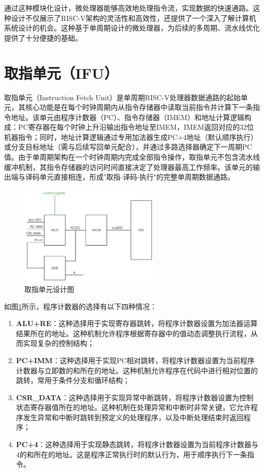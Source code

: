 通过这种模块化设计，微处理器能够高效地处理指令流，实现数据的快速通路。这种设计不仅展示了RISC-V架构的灵活性和高效性，还提供了一个深入了解计算机系统设计的机会。这种基于单周期设计的微处理器，为后续的多周期、流水线优化提供了十分便捷的基础。

\section{取指单元（IFU）}
取指单元（Instruction Fetch Unit）是单周期RISC-V处理器数据通路的起始单元，其核心功能是在每个时钟周期内从指令存储器中读取当前指令并计算下一条指令地址。该单元由程序计数器（PC）、指令存储器（IMEM）和地址计算逻辑构成：PC寄存器在每个时钟上升沿输出指令地址至IMEM，IMEM返回对应的32位机器指令；同时，地址计算逻辑通过专用加法器生成PC+4地址（默认顺序执行）或分支目标地址（需与后续写回单元配合），并通过多路选择器确定下一周期PC值。由于单周期架构在一个时钟周期内完成全部指令操作，取指单元不包含流水线缓冲机制，其指令存储器的访问时间直接决定了处理器最高工作频率。该单元的输出端与译码单元直接相连，形成"取指-译码-执行"的完整单周期数据通路。

\begin{figure}[htbp]
	\centering
	\includegraphics[width=0.6\textwidth]{image/ifu.pdf}
	\caption{取指单元设计图}
	\label{fig:ifu}
\end{figure}

如图\ref{fig:ifu}所示，程序计数器的选择有以下四种情况：

\begin{enumerate}[label={\arabic*)},itemsep=0pt, parsep=0pt]
	\item \textbf{ALU+RE}：这种选择用于实现寄存器跳转，将程序计数器设置为加法器运算结果所在的地址。这种机制允许程序根据寄存器中的值动态调整执行流程，从而实现复杂的控制结构；
	\item \textbf{PC+IMM}：这种选择用于实现PC相对跳转，将程序计数器设置为当前程序计数器与立即数的和所在的地址。这种机制允许程序在代码中进行相对位置的跳转，常用于条件分支和循环结构；
	\item \textbf{CSR\_DATA}：这种选择用于实现异常中断跳转，将程序计数器设置为控制状态寄存器值所在的地址。这种机制在处理异常和中断时非常关键，它允许程序发生异常和中断时跳转到预定义的处理程序，以及中断处理结束时返回程序；
	\item \textbf{PC+4}：这种选择用于实现静态跳转，将程序计数器设置为当前程序计数器与4的和所在的地址。这是程序正常执行时的默认行为，用于顺序执行下一条指令。
\end{enumerate}


